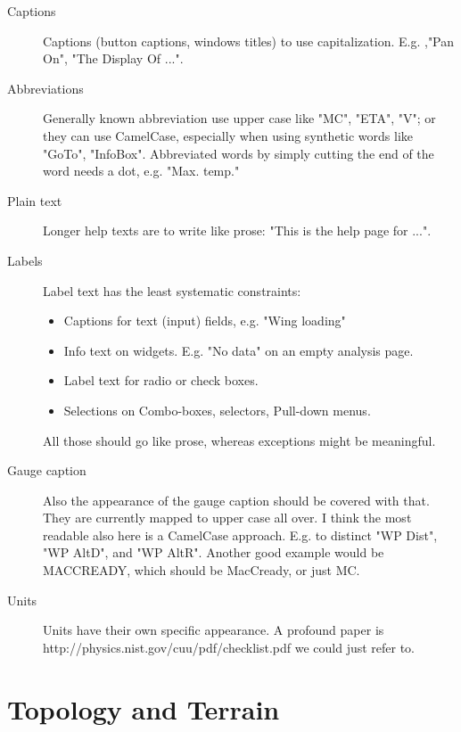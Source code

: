 \documentclass[a4paper,12pt]{refrep}
\begin{document}
\begin{description}
  \item[Captions] Captions (button captions, windows titles) to use
        capitalization. E.g. ,"Pan On", "The Display Of ...". 

  \item[Abbreviations] Generally known abbreviation use upper case like "MC", "ETA",
        "V"; or they can use CamelCase, especially when using synthetic
        words  like "GoTo", "InfoBox". 
        Abbreviated words by simply cutting the end of the word needs a
        dot, e.g. "Max. temp."

  \item[Plain text] Longer help texts are to write like prose: "This is the help
        page for ...".

  \item[Labels] Label text has the least systematic constraints:
\begin{itemize}
    \item Captions for text (input) fields, e.g. "Wing loading"
    \item Info text on widgets. E.g. "No data" on an empty
          analysis page. 
    \item Label text for radio or check boxes. 
    \item Selections on Combo-boxes, selectors, Pull-down menus. 
\end{itemize}
  All those should go like prose, whereas exceptions might be
  meaningful.
  
  \item[Gauge caption] Also the appearance of the gauge caption should be covered with
        that. They are currently mapped to upper case all over. I think
        the most readable also here is a CamelCase approach. E.g. to
        distinct "WP Dist", "WP AltD", and "WP AltR". Another good
        example would be MACCREADY, which should be MacCready, or just
        MC.

  \item[Units] Units have their own specific appearance. A profound paper is
        http://physics.nist.gov/cuu/pdf/checklist.pdf we could just
        refer to.
\end{description}


\chapter{Topology and Terrain}\label{cha:topology}
\end{document}
